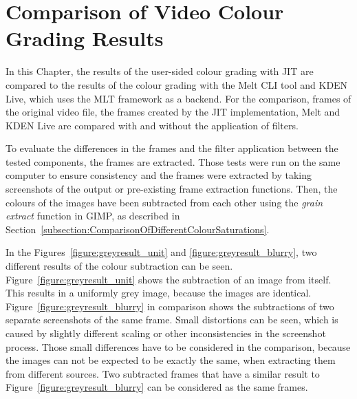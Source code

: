 \documentclass[../MasterThesis.tex]{subfiles}
\begin{document}
	
	
%
%
%
%
%
%
%
%
\newpage
\section{Comparison of Video Colour Grading Results} \label{section:experimentalevaluationanddiscussion}  


In this Chapter, the results of the user-sided colour grading with JIT are compared to the results of the colour grading with the Melt CLI tool and KDEN Live, which uses the MLT framework as a backend. For the comparison, frames of the original video file, the frames created by the JIT implementation, Melt and KDEN Live are compared with and without the application of filters.


To evaluate the differences in the frames and the filter application between the tested components, the frames are extracted. Those tests were run on the same computer to ensure consistency and the frames were extracted by taking screenshots of the output or pre-existing frame extraction functions.
Then, the colours of the images have been subtracted from each other using the \textit{grain extract} function in GIMP, as described in Section~\ref{subsection:ComparisonOfDifferentColourSaturations}.


In the Figures~\ref{figure:greyresult_unit} and \ref{figure:greyresult_blurry}, two different results of the colour subtraction can be seen. 
%
Figure~\ref{figure:greyresult_unit} shows the subtraction of an image from itself. This results in a uniformly grey image, because the images are identical. Figure~\ref{figure:greyresult_blurry} in comparison shows the subtractions of two separate screenshots of the same frame. Small distortions can be seen, which is caused by slightly different scaling or other inconsistencies in the screenshot process. Those small differences have to be considered in the comparison, because the images can not be expected to be exactly the same, when extracting them from different sources. Two subtracted frames that have a similar result to Figure~\ref{figure:greyresult_blurry} can be considered as the same frames.
\end{document}
